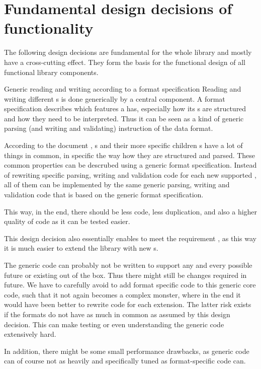 
\section{Fundamental design decisions of \LibName{} functionality}
\label{sec:Grld}

The following design decisions are fundamental for the whole library and mostly have a cross-cutting effect. They form the basis for the functional design of all functional library components.


{%
Generic reading and writing according to a format specification
}
{%
Reading and writing different \TERMcontainerFormat{}s is done generically by a central component. A format specification describes which features a \TERMcontainerFormat{} has, especially how its \TERMdataBlock{}s are structured and how they need to be interpreted. Thus it can be seen as a kind of generic parsing (and writing and validating) instruction of the data format.
}
{%
According to the document \cite{MC17}, \TERMcontainerFormat{}s and their more specific children \TERMmetadataFormat{}s have a lot of things in common, in specific the way how they are structured and parsed. These common properties can be descrubed using a generic format specification. Instead of rewriting specific parsing, writing and validation code for each new supported \TERMcontainerFormat{}, all of them can be implemented by the same generic parsing, writing and validation code that is based on the generic format specification.

This way, in the end, there should be less code, less duplication, and also a higher quality of code as it can be tested easier.

This design decision also essentially enables to meet the requirement , as this way it is much easier to extend the library with new \TERMcontainerFormat{}s.
}
{%
The generic code can probably not be written to support any and every possible future or existing \TERMcontainerFormat{} out of the box. Thus there might still be changes required in future. We have to carefully avoid to add format specific code to this generic core code, such that it not again becomes a complex monster, where in the end it would have been better to rewrite code for each extension. The latter risk exists if the formats do not have as much in common as assumed by this design decision. This can make testing or even understanding the generic code extensively hard.

In addition, there might be some small performance drawbacks, as generic code can of course not as heavily and specifically tuned as format-specific code can.
}

